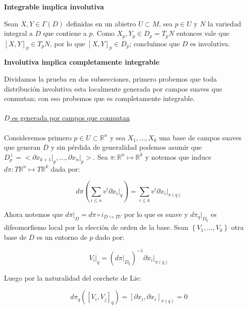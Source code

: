 \documentclass[11pt]{article}
\newcommand{\inc}{\hookrightarrow}
\newcommand{\R}{{\mathbb{R}}}
\newcommand{\sett}[1]{\left\lbrace#1\right\rbrace}
\newcommand{\Bigsum}[2]{\sum\limits_{#1}{#2}}
\numberwithin{theorem}{subsection}
\newenvironment{proof}[1][Demostraci\'on]{\begin{trivlist}
		\item[\hskip \labelsep {\bfseries #1}]}{\end{trivlist}}
\newenvironment{definition}[1][Definici\'on]{\begin{trivlist}
		\item[\hskip \labelsep {\bfseries #1}]}{\end{trivlist}}
\begin{document}
\begin{proof}
\begin{definition}
\begin{proof}
						\medskip
			
			\textbf{Integrable implica involutiva}
			
			\medskip
			
			Sean $X,Y \in \Gamma(D)$ definidas en un abietro $U \subset M$, sea $p \in U$ y $N$ la variedad integral a $D$ que contiene a $p$.  Como $X_p,Y_p \in D_p = T_pN$ entonces vale que $[X,Y]_p \in T_pN$, por lo que $[X,Y]_p \in D_p$; conclu\'imos que $D$ es involutiva.
			
			\medskip

			\textbf{Involutiva implica completamente integrable}

			\medskip			
			
			Dividamos la prueba en dos subsecciones, primero probemos que toda distribuci\'on involutiva esta localmente generada por campos suaves que conmutan; con eso probemos que es completamente integrable.
			\\\\
			\underline{$D$ es generada por campos que conmutan}
			\\\\
			Consideremos primero $p \in U \subset \R^n$ y sea $X_1, \dots, X_k$ una base de campos suaves que generan $D$ y sin p\'erdida de generalidad podemos asumir que $D_p^\perp = <\partial x_{k+1} \vert_p, \dots, \partial x_n \vert_p>$. Sea $\pi : \R^n \mapsto \R^k$ y notemos que induce $d \pi : T\R^n \mapsto T\R^k$ dada por:
			
			\begin{equation*}
				d\pi \left(\Bigsum{i \leq n}{v^i \partial x_{i} \vert_q}\right) = \Bigsum{i \leq k}{v^i \partial x_{i} \vert_{\pi(q)}}
			\end{equation*}
			
			Ahora notemos que $d \pi \vert_D = d \pi \circ i_{D \inc TU}$ por lo que es suave y $d \pi _q \vert_{D_q}$ es difeomorfismo local por la elecci\'on de orden de la base. Sean $\sett{V_1, \dots, V_k}$ otra base de $D$ es un entorno de $p$ dado por:
			
			\begin{equation*}
				V_i \vert_q = \left(d \pi \vert_{D_q}\right)^{-1} \partial x_{i} \vert_{\pi(q)}
			\end{equation*}
			
			Luego por la naturalidad del corchete de Lie:
			
			\begin{equation*}
				d \pi_q \left(\left[V_i, V_j\right]_q\right)   = \left[\partial x_{i} , \partial x_{i}\right]_{\pi(q)} = 0
			\end{equation*}
			

\end{proof}
\end{definition}
\end{proof}
\end{document}

